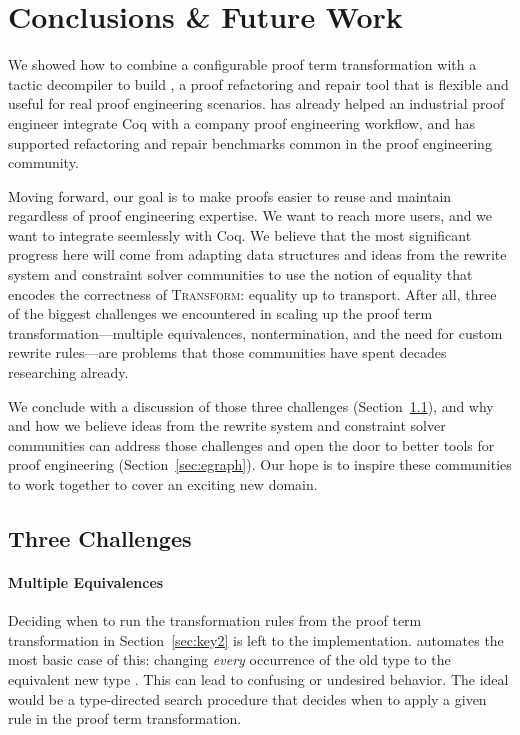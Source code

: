 \section{Conclusions \& Future Work}
\label{sec:discussion}

We showed how to combine a configurable proof term transformation with a tactic decompiler to build \toolname,
a proof refactoring and repair tool that is flexible and useful for real proof engineering scenarios.
\toolname has already helped an industrial proof engineer integrate Coq with a company proof engineering workflow,
and has supported refactoring and repair benchmarks common in the proof engineering community.

Moving forward, our goal is to make proofs easier to reuse and maintain regardless of proof engineering expertise.
We want to reach more users, and we want \toolname to integrate seemlessly with Coq.
We believe that the most significant progress here will come from adapting data structures and ideas
from the rewrite system and constraint solver communities to use the notion of equality that encodes the correctness of \textsc{Transform}: equality up 
to transport. After all, three of the biggest challenges we encountered in scaling up the \toolname proof term transformation---multiple equivalences, nontermination, and the need for custom rewrite rules---are problems that those communities have spent decades researching already.%

We conclude with a discussion of those three challenges (Section~\ref{sec:problems}), and why and how we believe ideas from the rewrite system and constraint
solver communities can address those challenges and open the door to better tools for proof engineering (Section~\ref{sec:egraph}).
Our hope is to inspire these communities to work together to cover an exciting new domain.

\subsection{Three Challenges}
\label{sec:problems}

\paragraph{Multiple Equivalences}

Deciding when to run the transformation rules from the proof term transformation in Section~\ref{sec:key2} is left to the implementation.
\toolname automates the most basic case of this: changing \textit{every} occurrence of the old type \A to the equivalent new type \B.
This can lead to confusing or undesired behavior.
The ideal would be a type-directed search procedure that decides when to apply a given rule in the proof term transformation.

